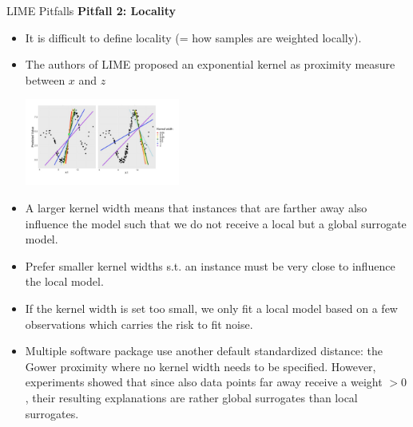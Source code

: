 \documentclass[aspectratio=169]{../latex_main/tntbeamer}  %
\begin{document}
\begin{frame}{LIME Pitfalls }
\vspace{-2em}
	\textbf{Pitfall 2: Locality}
	\begin{itemize} 
     \item It is difficult to define locality (= how samples are weighted locally). %
     \item The authors of LIME proposed an exponential kernel as proximity measure between $x$ and $z$
     	 \begin{center}
     		\includegraphics[width=0.4\textwidth]{figure/lime_locality}
     	\end{center}
     \item A larger kernel width means that instances that are farther away also influence the model such that we do not receive a local but a global surrogate model. 
     \item Prefer smaller kernel widths s.t. an instance must be very close to influence the local model.  
     \item If the kernel width is set too small, we only fit a local model based on a few observations which carries the risk to fit noise.   
	\item Multiple software package use another default standardized distance: the Gower proximity where no kernel width needs to be specified. However, experiments showed that since also data points far away receive a weight $ > 0$, their resulting explanations are rather global surrogates than local surrogates.   
\end{itemize}

\end{frame}
\end{document}
